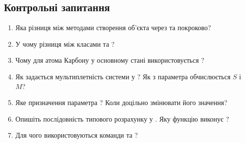 
\subsection*{Контрольні запитання}
\begin{enumerate}
	\item Яка різниця між методами створення об'єкта  через  та покроково?
	\item У чому різниця між класами  та ?
	\item Чому для атома Карбону у основному стані використовується ?
	\item Як задається мультиплетність системи у \PySCF? Як з параметра  обчислюється $S$ і $M$?
	\item Яке призначення параметра ? Коли доцільно змінювати його значення?
	\item Опишіть послідовність типового розрахунку у \PySCF. Яку функцію виконує ?
	\item Для чого використовуються команди  та ?
\end{enumerate}

